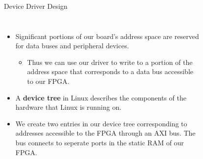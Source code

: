 \documentclass[aspectratio=169,xcolor=dvipsnames]{beamer}
\begin{document}
\begin{frame}{Device Driver Design}

    \begin{columns}
        \begin{itemize}
            \footnotesize
            \item Significant portions of our board's address space are reserved for data buses and peripheral devices.
                  \begin{itemize}
                      \footnotesize
                      \item Thus we can use our driver to write to a portion of the address space that corresponds to a data bus accessible to our FPGA.
                  \end{itemize}
            \item A \textbf{device tree} in Linux describes the components of the hardware that Linux is running on.
            \item We create two entries in our device tree corresponding to addresses accessible to the FPGA through an AXI bus. The bus connects to seperate ports in the static RAM of our FPGA.
        \end{itemize}

        \begin{figure}
            \centering


\end{figure}
\end{columns}
\end{frame}
\end{document}
